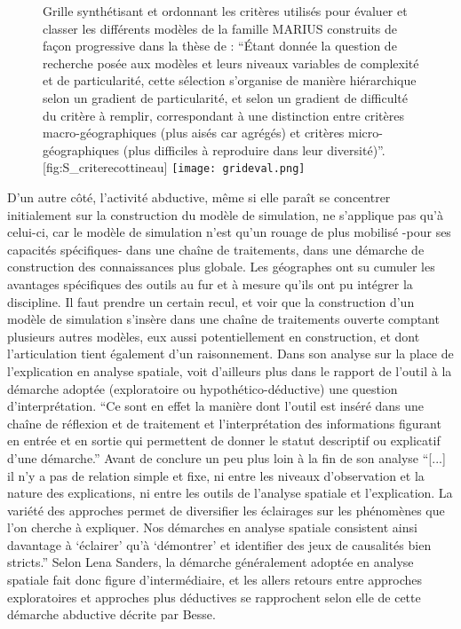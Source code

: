 \begin{figure}[htbp]
\begin{sidecaption}{Grille synthétisant et ordonnant les critères utilisés pour évaluer et classer les différents modèles de la famille MARIUS construits de façon progressive dans la thèse de \textcite[329]{Cottineau2014b} : \enquote{Étant donnée la question de recherche posée aux modèles et leurs niveaux variables de complexité et de particularité, cette sélection s’organise de manière hiérarchique selon un gradient de particularité, et selon un gradient de difficulté du critère à remplir, correspondant à une distinction entre critères macro-géographiques (plus aisés car agrégés) et critères micro-géographiques (plus difficiles à reproduire dans leur diversité)}.}[fig:S_criterecottineau]
  \centering
 \texttt{[image: grideval.png]}
  \end{sidecaption}
\end{figure}

D'un autre côté, l'activité abductive, même si elle paraît se concentrer initialement sur la construction du modèle de simulation, ne s'applique pas qu'à celui-ci, car le modèle de simulation n'est qu'un rouage de plus mobilisé -pour ses capacités spécifiques- dans une chaîne de traitements, dans une démarche de construction des connaissances plus globale. Les géographes ont su cumuler les avantages spécifiques des outils au fur et à mesure qu'ils ont pu intégrer la discipline. Il faut prendre un certain recul, et voir que la construction d'un modèle de simulation s'insère dans une chaîne de traitements ouverte comptant plusieurs autres modèles, eux aussi potentiellement en construction, et dont l'articulation tient également d'un raisonnement. Dans son analyse sur la place de l'explication en analyse spatiale, \textcite{Sanders2000} voit d'ailleurs plus dans le rapport de l'outil à la démarche adoptée (exploratoire ou hypothético-déductive) une question d'interprétation. \enquote{Ce sont en effet la manière dont l'outil est inséré dans une chaîne de réflexion et de traitement et l'interprétation des informations figurant en entrée et en sortie qui permettent de donner le statut descriptif ou explicatif d'une démarche.} Avant de conclure un peu plus loin à la fin de son analyse \enquote{[...] il n'y a pas de relation simple et fixe, ni entre les niveaux d'observation et la nature des explications, ni entre les outils de l'analyse spatiale et l'explication. La variété des approches permet de diversifier les éclairages sur les phénomènes que l'on cherche à expliquer. Nos démarches en analyse spatiale consistent ainsi davantage à \enquote{éclairer} qu'à \enquote{démontrer} et identifier des jeux de causalités bien stricts.} Selon Lena Sanders, la démarche généralement adoptée en analyse spatiale fait donc figure d'intermédiaire, et les allers retours entre approches exploratoires et approches plus déductives se rapprochent selon elle de cette démarche abductive décrite par Besse.

